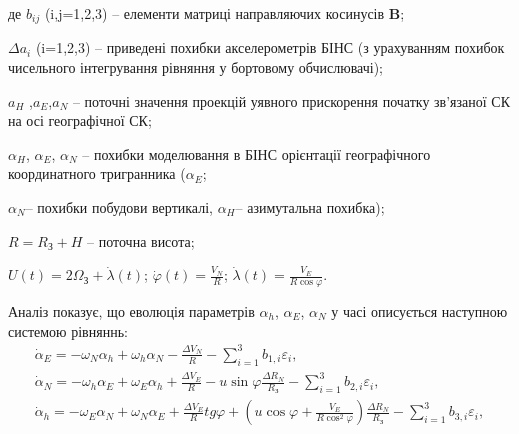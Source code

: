 \begin{ESKDexplanation}
\item де $b_{ij}$ (i,j=1,2,3) -- елементи матриці направляючих косинусів \textbf{B}; 
\item $\Delta a_{i}$ (i=1,2,3) -- приведені похибки акселерометрів БІНС (з урахуванням 
похибок чисельного інтегрування рівняння  у бортовому обчислювачі); 
\item $a_{H}$ ,$a_{E}$,$a_{N}$ -- поточні значення проекцій уявного прискорення початку зв'язаної СК на 
осі географічної СК; 
\item $\alpha_{H}$, $\alpha_{E}$, $\alpha_{N}$ -- похибки моделювання 
в БІНС орієнтації географічного координатного тригранника ($\alpha_{E} $;
\item $\alpha_{N} $-- похибки побудови вертикалі, $\alpha_{H} $-- азимутальна похибка); 
\item $R=R_{\text{З}} +H$ -- поточна висота; 
\item $U(t)=2\Omega_{\text{З}} +\dot{\lambda }(t)$; $\dot{\varphi}(t)=\frac{V_{N}}{R}$; $\dot{\lambda }(t)=\frac{V_{E}}{R\cos \varphi }.$ 
\end{ESKDexplanation}
  Аналіз показує, що еволюція параметрів $\alpha_{h}$, $\alpha_{E}$, $\alpha_{N}$ у часі описується наступною системою рівняннь:
\begin{equation} 
\label{eq:dasdins} \begin{array}{l} 
{\dot{\alpha }_{E} =-\omega_{N} \alpha_{h} +\omega_{h} \alpha_{N} -\frac{\Delta V_{N} }{R} -\sum_{i=1}^{3}b_{1,i}\varepsilon_{i} ,} \\
{\dot{\alpha }_{N} =-\omega_{h} \alpha_{E} +\omega_{E} \alpha_{h} +\frac{\Delta V_{E} }{R} -u\sin \varphi \frac{\Delta R_{N} }{R_{З} }
-\sum_{i=1}^{3}b_{2,i}  \varepsilon_{i} ,} \\ 
{\dot{\alpha }_{h} =-\omega_{E} \alpha_{N} +\omega_{N} \alpha_{E} +\frac{\Delta V_{E} }{R} tg\varphi +(u\cos \varphi +\frac{V_{E} }{R\cos ^{2} \varphi } )
\frac{\Delta R_{N} }{R_{З} } -\sum_{i=1}^{3}b_{3,i}\varepsilon_{i} ,} \end{array} \end{equation} 

